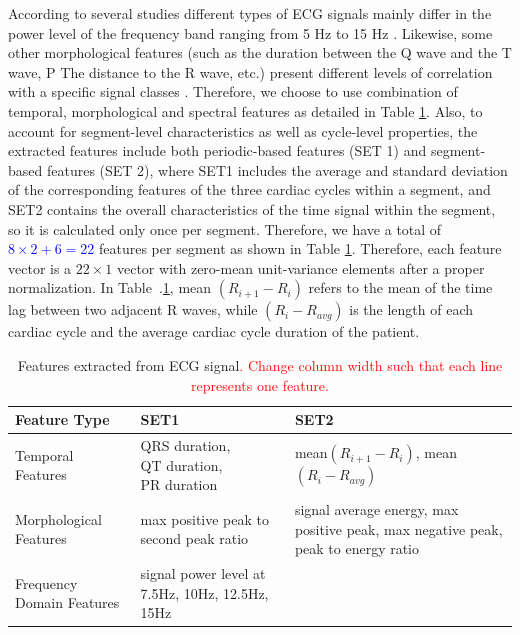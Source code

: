 According to several studies different types of ECG signals mainly differ in the power level of the frequency band ranging from 5 Hz to 15 Hz \cite{XXX}. Likewise, some other morphological features (such as the duration between the Q wave and the T wave, P The distance to the R wave, etc.) present different levels of correlation with a specific signal classes \cite{XXX}. Therefore, we choose to use combination of temporal, morphological and spectral features as detailed in Table \ref{table:features}. Also, to account for segment-level characteristics as well as cycle-level properties, the extracted features include both periodic-based features (SET 1) and segment-based features (SET 2), where SET1 includes the average and standard deviation of the corresponding features of the three cardiac cycles within a segment, and SET2 contains the overall characteristics of the time signal within the segment, so it is calculated only once per segment. Therefore, we have a total of \textcolor{blue}{$8 \times 2 + 6 =22$} features per segment as shown in Table \ref{table:features}. Therefore, each feature vector is a $22×1$ vector with zero-mean unit-variance elements after a proper normalization. %
In Table~.\ref{table:features}, mean $(R_{i+1}-R_i)$ refers to the mean of the time lag between two adjacent R waves, while $(R_i-R_{avg})$ is the length of each cardiac cycle and the average cardiac cycle duration of the patient. 

\begin{table}[t]
	\caption{Features extracted from ECG signal\textcolor{red}{. Change column width such that each line represents one feature.}}
	\label{table:features}
	\centering
	\begin{tabular}{|m{6em} || @{}m{7.4em} ||@{} m{7.7em}|}
		\hline 
		Feature Type & SET1 & SET2 \\ 
		\hline 
		Temporal Features & QRS duration, ~~~~
		QT duration, ~~~~~~~
		PR duration & mean$(R_{i+1}-R_i)$, mean$(R_i-R_{avg})$  \\ 
		\hline 
		Morphological Features & max positive peak to second peak ratio & signal average energy, max positive peak, max
		negative
		peak, peak to
		energy ratio \\ 
		\hline 
		Frequency Domain Features & signal power level at 7.5Hz, 10Hz, 12.5Hz, 15Hz &  \\ 
		\hline 
	\end{tabular} 
\end{table}

